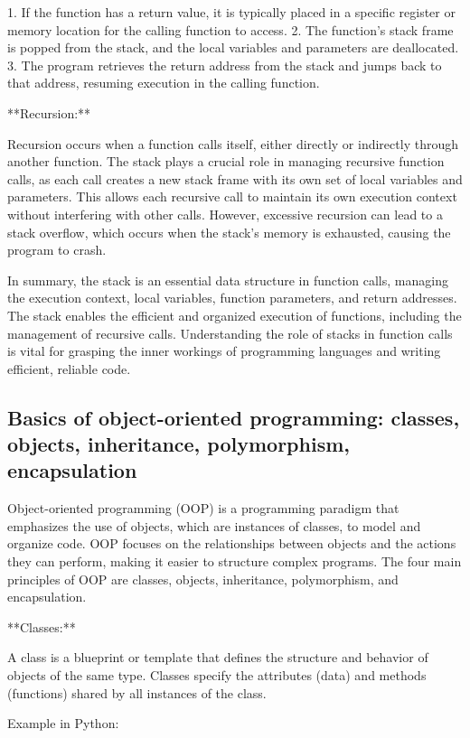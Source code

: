 \documentclass{article}
\begin{document}
1. If the function has a return value, it is typically placed in a specific register or memory location for the calling function to access.
2. The function's stack frame is popped from the stack, and the local variables and parameters are deallocated.
3. The program retrieves the return address from the stack and jumps back to that address, resuming execution in the calling function.

**Recursion:**

Recursion occurs when a function calls itself, either directly or indirectly through another function. The stack plays a crucial role in managing recursive function calls, as each call creates a new stack frame with its own set of local variables and parameters. This allows each recursive call to maintain its own execution context without interfering with other calls. However, excessive recursion can lead to a stack overflow, which occurs when the stack's memory is exhausted, causing the program to crash.

In summary, the stack is an essential data structure in function calls, managing the execution context, local variables, function parameters, and return addresses. The stack enables the efficient and organized execution of functions, including the management of recursive calls. Understanding the role of stacks in function calls is vital for grasping the inner workings of programming languages and writing efficient, reliable code.


\subsection{Basics of object-oriented programming: classes, objects, inheritance, polymorphism, encapsulation}

Object-oriented programming (OOP) is a programming paradigm that emphasizes the use of objects, which are instances of classes, to model and organize code. OOP focuses on the relationships between objects and the actions they can perform, making it easier to structure complex programs. The four main principles of OOP are classes, objects, inheritance, polymorphism, and encapsulation.

**Classes:**

A class is a blueprint or template that defines the structure and behavior of objects of the same type. Classes specify the attributes (data) and methods (functions) shared by all instances of the class.

Example in Python:
\end{document}
